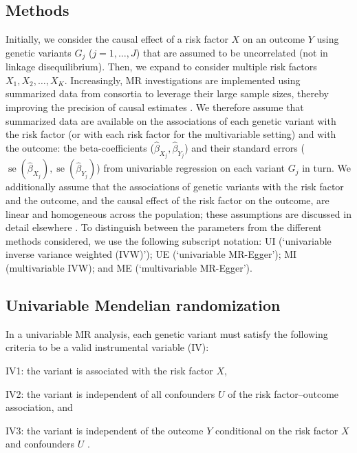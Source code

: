 \documentclass[a4paper,12pt]{article}
\DeclareMathOperator{\se}{se} %
\begin{document}
\begin{bibunit}[wileyj]
\section{Methods}
\label{sec:methods}
Initially, we consider the causal effect of a risk factor $X$ on an outcome $Y$ using genetic variants $G_{j}$ ($j = 1, \ldots, J$) that are assumed to be uncorrelated (not in linkage disequilibrium). Then, we expand to consider multiple risk factors $X_1, X_2, \ldots, X_K$. Increasingly, MR investigations are implemented using summarized data from consortia to leverage their large sample sizes, thereby improving the precision of causal estimates \cite{burgess2015publishedata}. We therefore assume that summarized data are available on the associations of each genetic variant with the risk factor (or with each risk factor for the multivariable setting) and with the outcome: the beta-coefficients ($\hat{\beta}_{X_{j}}, \hat{\beta}_{Y_{j}}$) and their standard errors ($\se(\hat{\beta}_{X_{j}}), \se(\hat{\beta}_{Y_{j}})$) from univariable regression on each variant $G_{j}$ in turn. We additionally assume that the associations of genetic variants with the risk factor and the outcome, and the causal effect of the risk factor on the outcome, are linear and homogeneous across the population; these assumptions are discussed in detail elsewhere \cite{burgess2016multiple}. To distinguish between the parameters from the different methods considered, we use the following subscript notation: UI (`univariable inverse variance weighted (IVW)'); UE (`univariable MR-Egger'); MI (multivariable IVW); and ME (`multivariable MR-Egger').   

\subsection{Univariable Mendelian randomization}
In a univariable MR analysis, each genetic variant must satisfy the following criteria to be a valid instrumental variable (IV):  \\
\begin{compactitem}
\item IV1: the variant is associated with the risk factor $X$, %
\item IV2: the variant is independent of all confounders $U$ of the risk factor--outcome association, and
\item IV3: the variant is independent of the outcome $Y$ conditional on the risk factor $X$ and confounders $U$ \cite{greenland2000}. \\
\end{compactitem}


\end{bibunit}
\end{document}
